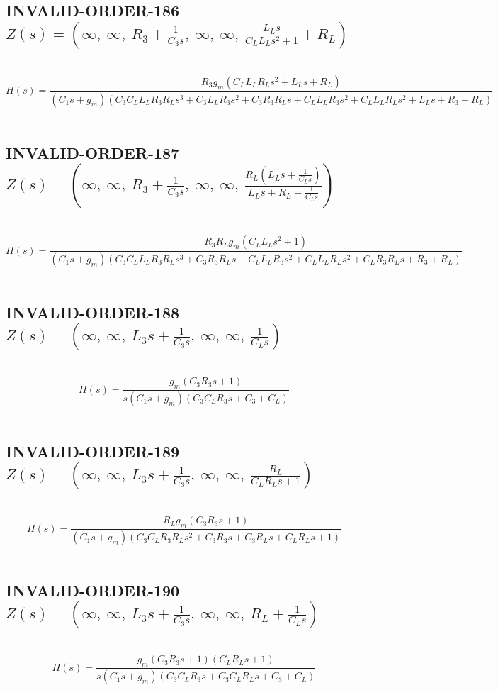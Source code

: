 \documentclass{article}
\begin{document}
\subsection{INVALID-ORDER-186 $Z(s) = \left( \infty, \  \infty, \  R_{3} + \frac{1}{C_{3} s}, \  \infty, \  \infty, \  \frac{L_{L} s}{C_{L} L_{L} s^{2} + 1} + R_{L}\right)$ } \ 
\textbf{\[H(s) = \frac{R_{3} g_{m} \left(C_{L} L_{L} R_{L} s^{2} + L_{L} s + R_{L}\right)}{\left(C_{1} s + g_{m}\right) \left(C_{3} C_{L} L_{L} R_{3} R_{L} s^{3} + C_{3} L_{L} R_{3} s^{2} + C_{3} R_{3} R_{L} s + C_{L} L_{L} R_{3} s^{2} + C_{L} L_{L} R_{L} s^{2} + L_{L} s + R_{3} + R_{L}\right)}\] } \ 
\subsection{INVALID-ORDER-187 $Z(s) = \left( \infty, \  \infty, \  R_{3} + \frac{1}{C_{3} s}, \  \infty, \  \infty, \  \frac{R_{L} \left(L_{L} s + \frac{1}{C_{L} s}\right)}{L_{L} s + R_{L} + \frac{1}{C_{L} s}}\right)$ } \ 
\textbf{\[H(s) = \frac{R_{3} R_{L} g_{m} \left(C_{L} L_{L} s^{2} + 1\right)}{\left(C_{1} s + g_{m}\right) \left(C_{3} C_{L} L_{L} R_{3} R_{L} s^{3} + C_{3} R_{3} R_{L} s + C_{L} L_{L} R_{3} s^{2} + C_{L} L_{L} R_{L} s^{2} + C_{L} R_{3} R_{L} s + R_{3} + R_{L}\right)}\] } \ 
\subsection{INVALID-ORDER-188 $Z(s) = \left( \infty, \  \infty, \  L_{3} s + \frac{1}{C_{3} s}, \  \infty, \  \infty, \  \frac{1}{C_{L} s}\right)$ } \ 
\textbf{\[H(s) = \frac{g_{m} \left(C_{3} R_{3} s + 1\right)}{s \left(C_{1} s + g_{m}\right) \left(C_{3} C_{L} R_{3} s + C_{3} + C_{L}\right)}\] } \ 
\subsection{INVALID-ORDER-189 $Z(s) = \left( \infty, \  \infty, \  L_{3} s + \frac{1}{C_{3} s}, \  \infty, \  \infty, \  \frac{R_{L}}{C_{L} R_{L} s + 1}\right)$ } \ 
\textbf{\[H(s) = \frac{R_{L} g_{m} \left(C_{3} R_{3} s + 1\right)}{\left(C_{1} s + g_{m}\right) \left(C_{3} C_{L} R_{3} R_{L} s^{2} + C_{3} R_{3} s + C_{3} R_{L} s + C_{L} R_{L} s + 1\right)}\] } \ 
\subsection{INVALID-ORDER-190 $Z(s) = \left( \infty, \  \infty, \  L_{3} s + \frac{1}{C_{3} s}, \  \infty, \  \infty, \  R_{L} + \frac{1}{C_{L} s}\right)$ } \ 
\textbf{\[H(s) = \frac{g_{m} \left(C_{3} R_{3} s + 1\right) \left(C_{L} R_{L} s + 1\right)}{s \left(C_{1} s + g_{m}\right) \left(C_{3} C_{L} R_{3} s + C_{3} C_{L} R_{L} s + C_{3} + C_{L}\right)}\] } \ 
\end{document}
